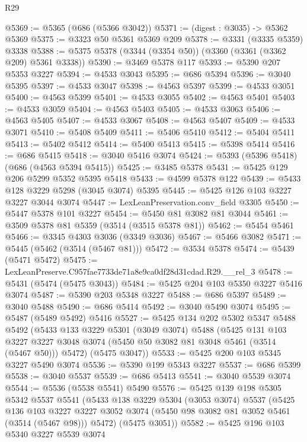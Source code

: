 \begin{lexlean}{R29}
\begin{coremodule}
@5369 := @5365 (@686 (@5366 @3042))
@5371 := (digest : @3035) -> @5362 @5369
@5375 := @3323 @50 @5361 @5369 @209
@5378 := @3331 (@3335 @5359) @3338
@5388 := @5375 @5378 (@3344 (@3354 @50)) (@3360 (@3361 (@3362 @209) @5361 @3338))
@5390 := @3469 @5378 @117
@5393 := @5390 @207 @5353 @3227
@5394 := @4533 @3043
@5395 := @686 @5394
@5396 := @3040 @5395
@5397 := @4533 @3047
@5398 := @4563 @5397
@5399 := @4533 @3051
@5400 := @4563 @5399
@5401 := @4533 @3055
@5402 := @4563 @5401
@5403 := @4533 @3059
@5404 := @4563 @5403
@5405 := @4533 @3063
@5406 := @4563 @5405
@5407 := @4533 @3067
@5408 := @4563 @5407
@5409 := @4533 @3071
@5410 := @5408 @5409
@5411 := @5406 @5410
@5412 := @5404 @5411
@5413 := @5402 @5412
@5414 := @5400 @5413
@5415 := @5398 @5414
@5416 := @686 @5415
@5418 := @3040 @5416 @3074
@5424 := @5393 (@5396 @5418) (@686 (@4563 @5394 @5415))
@5425 := @3485 @5378
@5431 := @5425 @129 @206 @5299 @5352 @5395 @5418
@5433 := @4599 @5378 @122
@5439 := @5433 @128 @3229 @5298 (@3045 @3074) @5395
@5445 := @5425 @126 @103 @3227 @3227 @3044 @3074
@5447 := LexLeanPreservation.conv_field @3305
@5450 := @5447 @5378 @101 @3227
@5454 := @5450 @81 @3082 @81 @3044
@5461 := @3509 @5378 @81 @5359 (@3514 (@3515 @5378 @81))
@5462 := @5454 @5461
@5466 := @3345 @4303 @3036 (@3349 @3036)
@5467 := @5466 @3082
@5471 := @5445 (@5462 (@3514 (@5467 @81)))
@5472 := @3534 @5378
@5474 := @5439 (@5471 @5472)
@5475 := LexLeanPreserve.C957fae7733de71a8e9ca0df28d31cdad.R29.__rel_3
@5478 := @5431 (@5474 (@5475 @3043))
@5484 := @5425 @204 @103 @5350 @3227 @5416 @3074
@5487 := @5390 @203 @5348 @3227
@5488 := @686 @5397
@5489 := @3040 @5488
@5490 := @686 @5414
@5492 := @3040 @5490 @3074
@5495 := @5487 (@5489 @5492) @5416
@5527 := @5425
    @134
    @202
    @5302
    @5347
    @5488
    @5492
    (@5433
      @133
      @3229
      @5301
      (@3049 @3074)
      @5488
      (@5425
        @131
        @103
        @3227
        @3227
        @3048
        @3074
        (@5450 @50 @3082 @81 @3048 @5461 (@3514 (@5467 @50)))
        @5472)
      (@5475 @3047))
@5533 := @5425 @200 @103 @5345 @3227 @5490 @3074
@5536 := @5390 @199 @5343 @3227
@5537 := @686 @5399
@5538 := @3040 @5537
@5539 := @686 @5413
@5541 := @3040 @5539 @3074
@5544 := @5536 (@5538 @5541) @5490
@5576 := @5425
    @139
    @198
    @5305
    @5342
    @5537
    @5541
    (@5433
      @138
      @3229
      @5304
      (@3053 @3074)
      @5537
      (@5425
        @136
        @103
        @3227
        @3227
        @3052
        @3074
        (@5450 @98 @3082 @81 @3052 @5461 (@3514 (@5467 @98)))
        @5472)
      (@5475 @3051))
@5582 := @5425 @196 @103 @5340 @3227 @5539 @3074

\end{coremodule}
\end{lexlean}

